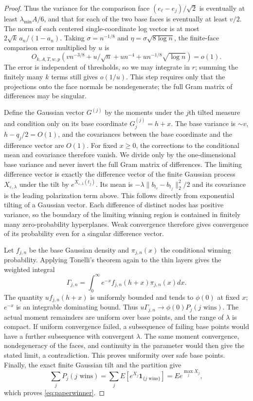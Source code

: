 \documentclass[a4paper,11pt]{article}
\theoremstyle{remark}
\begin{document}
\begin{proof}
Thus the variance for the comparison face $(e_\ell-e_j)/\sqrt2$ is eventually at least
$\lambda_{\min}A/6$, and that for each of the two base faces is eventually at least $v/2$.
The norm of each centered single-coordinate log vector is at most $2\sqrt k\,a_n/(1-a_n)$.
Taking $\sigma=n^{-1/8}$ and $\eta=\sigma\sqrt{8\log n}$, the finite-face comparison error multiplied by $u$ is
\[
 O_{k,A,T,w,p}(vn^{-3/8}+u/\sqrt n+un^{-4}
 +un^{-1/8}\sqrt{\log n})=o(1).
\]
The error is independent of thresholds, so we may integrate in $r$; summing the finitely many $k$ terms still gives $o(1/u)$.
This step requires only that the projections onto the face normals be nondegenerate; the full Gram matrix of differences may be singular.

Define the Gaussian vector $G^{(j)}$ by the moments under the $j$th tilted measure and condition only on its base coordinate
$G_j^{(j)}=h+x$. The base variance is $\sim v$, $h-q_j/2=O(1)$, and the covariances between the base coordinate and the difference vector
are $O(1)$. For fixed $x\ge0$, the corrections to the conditional mean and covariance therefore vanish.
We divide only by the one-dimensional base variance and never invert the full Gram matrix of differences.
The limiting difference vector is exactly the difference vector of the finite Gaussian process $X_{\varepsilon,\lambda}$
under the tilt by $e^{X_{\varepsilon,\lambda}(t_j)}$. Its mean is
$-\lambda\|b_{t_\ell}-b_{t_j}\|_2^2/2$ and its covariance is the leading polarization term above.
This follows directly from exponential tilting of a Gaussian vector.
Each difference of distinct nodes has positive variance, so the boundary of the limiting winning region is contained in finitely many zero-probability hyperplanes.
Weak convergence therefore gives convergence of its probability even for a singular difference vector.

Let $f_{j,n}$ be the base Gaussian density and $\pi_{j,n}(x)$ the conditional winning probability.
Applying Tonelli's theorem again to the thin layers gives the weighted integral
\[
 \Gamma_{j,n}=\int_0^\infty e^{-x}f_{j,n}(h+x)\pi_{j,n}(x)dx.
\]
The quantity $uf_{j,n}(h+x)$ is uniformly bounded and tends to $\phi(0)$ at fixed $x$; $e^{-x}$ is an integrable dominating bound.
Thus $u\Gamma_{j,n}\to\phi(0)P_j(j\text{ wins})$.
The actual moment remainders are uniform over base points, and the range of $\lambda$ is compact.
If uniform convergence failed, a subsequence of failing base points would have a further subsequence with convergent $\lambda$. The same moment convergence,
nondegeneracy of the faces, and continuity in the parameter would then give the stated limit, a contradiction. This proves uniformity over safe base points.
Finally, the exact finite Gaussian tilt and the partition give
\[
 \sum_jP_j(j\text{ wins})
 =\sum_jE[e^{X_j}\mathbf1_{\{j\text{ wins}\}}]=E e^{\max_jX_j},
\]
which proves \eqref{eq:paperwinner}.


\end{proof}
\end{document}
